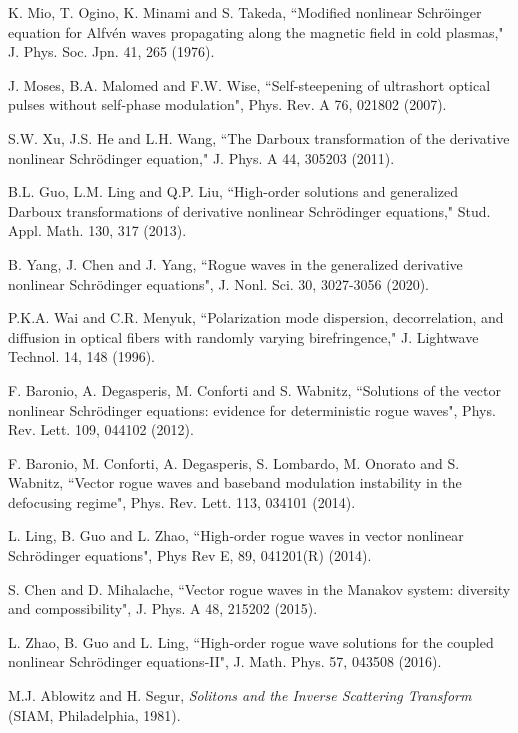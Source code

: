 \documentclass[amsmath,amssymb]{revtex4}
\begin{document}
\begin{thebibliography}{10}
K. Mio, T. Ogino, K. Minami and S. Takeda,
``Modified nonlinear Schr\"{o}inger equation for Alfv\'en waves propagating along the magnetic field in cold plasmas,"
J. Phys. Soc. Jpn. 41, 265 (1976).

J. Moses, B.A. Malomed and F.W. Wise,
``Self-steepening of ultrashort optical pulses without self-phase modulation",
Phys. Rev. A 76, 021802 (2007).

S.W. Xu, J.S. He and L.H. Wang,
``The Darboux transformation of the derivative nonlinear Schr\"odinger equation,"
J. Phys. A 44, 305203 (2011).

B.L. Guo, L.M. Ling and Q.P. Liu,
``High-order solutions and generalized Darboux transformations of derivative nonlinear Schr\"odinger equations,"
Stud. Appl. Math. 130, 317 (2013).

B. Yang, J. Chen and J. Yang,
``Rogue waves in the generalized derivative nonlinear Schr\"{o}dinger equations", J. Nonl. Sci. 30, 3027-3056 (2020).

P.K.A. Wai and C.R. Menyuk,
``Polarization mode dispersion, decorrelation, and diffusion in optical fibers with randomly varying birefringence,"
J. Lightwave Technol. 14, 148 (1996).

F. Baronio, A. Degasperis, M. Conforti and S. Wabnitz,
``Solutions of the vector nonlinear Schr\"odinger equations: evidence for deterministic rogue waves",
Phys. Rev. Lett. 109, 044102 (2012).

F. Baronio, M. Conforti, A. Degasperis, S. Lombardo, M. Onorato and S. Wabnitz,
``Vector rogue waves and baseband modulation instability in the defocusing regime",
Phys. Rev. Lett. 113, 034101 (2014).

L. Ling, B. Guo and L. Zhao, ``High-order rogue waves in vector nonlinear Schr\"{o}dinger equations", Phys Rev E, 89, 041201(R) (2014).

S. Chen and D. Mihalache, ``Vector rogue waves in the Manakov system: diversity and compossibility",
J. Phys. A 48, 215202 (2015).

L. Zhao, B. Guo and L. Ling, ``High-order rogue wave solutions for the coupled
nonlinear Schr\"odinger equations-II", J. Math. Phys. 57, 043508 (2016).

M.J. Ablowitz and H. Segur, \emph{Solitons and the Inverse Scattering Transform} (SIAM, Philadelphia, 1981).


\end{thebibliography}
\end{document}
